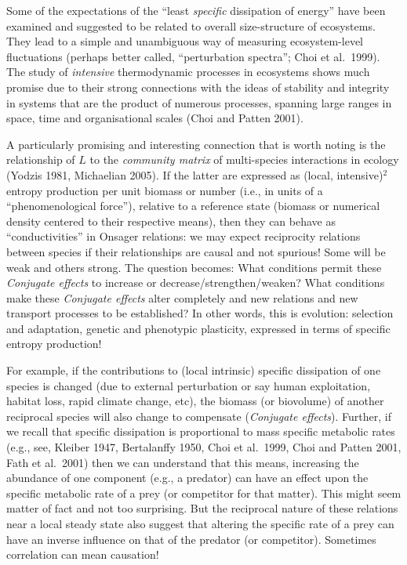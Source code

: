 \documentclass[11pt,letterpaper,]{paper}
\begin{document}
Some of the expectations of the ``least \emph{specific} dissipation of
energy'' have been examined and suggested to be related to overall
size-structure of ecosystems. They lead to a simple and unambiguous way
of measuring ecosystem-level fluctuations (perhaps better called,
``perturbation spectra''; Choi et al.~1999). The study of
\emph{intensive} thermodynamic processes in ecosystems shows much
promise due to their strong connections with the ideas of stability and
integrity in systems that are the product of numerous processes,
spanning large ranges in space, time and organisational scales (Choi and
Patten 2001).

A particularly promising and interesting connection that is worth noting
is the relationship of \(L\) to the \emph{community matrix} of
multi-species interactions in ecology (Yodzis 1981, Michaelian 2005). If
the latter are expressed as (local, intensive)\(^2\) entropy production
per unit biomass or number (i.e., in units of a ``phenomenological
force''), relative to a reference state (biomass or numerical density
centered to their respective means), then they can behave as
``conductivities'' in Onsager relations: we may expect reciprocity
relations between species if their relationships are causal and not
spurious! Some will be weak and others strong. The question becomes:
What conditions permit these \emph{Conjugate effects} to increase or
decrease/strengthen/weaken? What conditions make these \emph{Conjugate
effects} alter completely and new relations and new transport processes
to be established? In other words, this is evolution: selection and
adaptation, genetic and phenotypic plasticity, expressed in terms of
specific entropy production!

For example, if the contributions to (local intrinsic) specific
dissipation of one species is changed (due to external perturbation or
say human exploitation, habitat loss, rapid climate change, etc), the
biomass (or biovolume) of another reciprocal species will also change to
compensate (\emph{Conjugate effects}). Further, if we recall that
specific dissipation is proportional to mass specific metabolic rates
(e.g., see, Kleiber 1947, Bertalanffy 1950, Choi et al.~1999, Choi and
Patten 2001, Fath et al.~2001) then we can understand that this means,
increasing the abundance of one component (e.g., a predator) can have an
effect upon the specific metabolic rate of a prey (or competitor for
that matter). This might seem matter of fact and not too surprising. But
the reciprocal nature of these relations near a local steady state also
suggest that altering the specific rate of a prey can have an inverse
influence on that of the predator (or competitor). Sometimes correlation
can mean causation!
\end{document}
